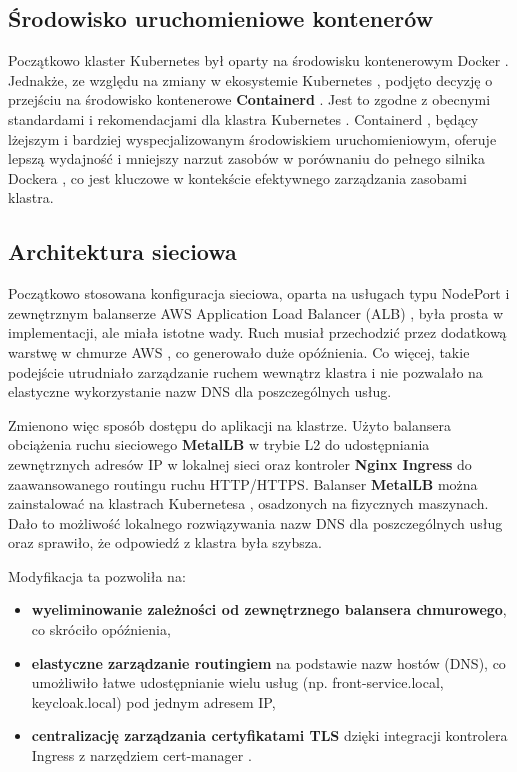 \subsection{Środowisko uruchomieniowe kontenerów}

Początkowo klaster Kubernetes \cite{kubernetes} był oparty na środowisku kontenerowym Docker \cite{docker_docs}. Jednakże, ze względu na zmiany w ekosystemie Kubernetes \cite{kubernetes}, podjęto decyzję o przejściu na środowisko kontenerowe \textbf{Containerd} \cite{containerd_docs}. Jest to zgodne z obecnymi standardami i rekomendacjami dla klastra Kubernetes \cite{kubernetes}. Containerd \cite{containerd_docs}, będący lżejszym i bardziej wyspecjalizowanym środowiskiem uruchomieniowym, oferuje lepszą wydajność i mniejszy narzut zasobów w porównaniu do pełnego silnika Dockera \cite{docker_docs}, co jest kluczowe w kontekście efektywnego zarządzania zasobami klastra.

\subsection{Architektura sieciowa}

Początkowo stosowana konfiguracja sieciowa, oparta na usługach typu NodePort \cite{nodeport_docs} i zewnętrznym balanserze AWS Application Load Balancer (ALB) \cite{alb_docs}, była prosta w implementacji, ale miała istotne wady. Ruch musiał przechodzić przez dodatkową warstwę w chmurze AWS \cite{aws_docs}, co generowało duże opóźnienia. Co więcej, takie podejście utrudniało zarządzanie ruchem wewnątrz klastra i nie pozwalało na elastyczne wykorzystanie nazw DNS dla poszczególnych usług.

Zmienono więc sposób dostępu do aplikacji na klastrze. Użyto balansera obciążenia ruchu sieciowego \textbf{MetalLB} \cite{metallb_docs} w trybie L2 do udostępniania zewnętrznych adresów IP w lokalnej sieci oraz kontroler \textbf{Nginx Ingress} \cite{nginx_ingress_docs} do zaawansowanego routingu ruchu HTTP/HTTPS. Balanser \textbf{MetalLB} \cite{metallb_docs} można zainstalować na klastrach Kubernetesa \cite{kubernetes}, osadzonych na fizycznych maszynach. Dało to możliwość lokalnego rozwiązywania nazw DNS dla poszczególnych usług oraz sprawiło, że odpowiedź z klastra była szybsza.

Modyfikacja ta pozwoliła na:
\begin{itemize}
    \item \textbf{wyeliminowanie zależności od zewnętrznego balansera chmurowego}, co skróciło opóźnienia,
    \item \textbf{elastyczne zarządzanie routingiem} na podstawie nazw hostów (DNS), co umożliwiło łatwe udostępnianie wielu usług (np. front-service.local, keycloak.local) pod jednym adresem IP,
    \item \textbf{centralizację zarządzania certyfikatami TLS} dzięki integracji kontrolera Ingress z narzędziem cert-manager \cite{cert_manager_docs}.
\end{itemize}
